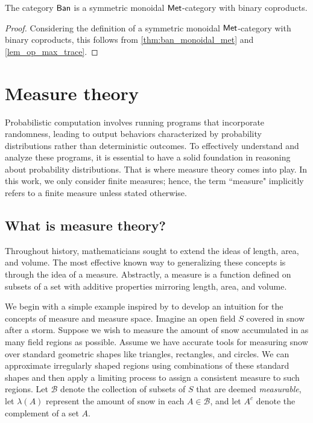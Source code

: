   \begin{theorem}
      The category $\mathsf{Ban}$ is a  symmetric monoidal $\mathsf{Met}$-category with binary coproducts.
  \end{theorem}

\begin{proof}
  Considering the definition of a symmetric monoidal $\mathsf{Met}$-category with binary coproducts, this follows from \autoref{thm:ban_monoidal_met} and \autoref{lem_op_max_trace}.    
\end{proof}



\section{Measure theory}
Probabilistic computation involves running programs that incorporate randomness, leading to output behaviors characterized by probability distributions rather than deterministic outcomes. To effectively understand and analyze these programs, it is essential to have a solid foundation in reasoning about probability distributions. That is where measure theory comes into play.
In this work, we only consider finite measures; hence, the term ``measure" implicitly refers to a finite measure unless stated otherwise.

\subsection{What is measure theory?}

Throughout history, mathematicians sought to extend the ideas of length, area, and volume. The most effective known way to generalizing these concepts is through the idea of a measure. Abstractly, a measure is a function defined on subsets of a set with additive properties mirroring length, area, and volume.

We begin with a simple example inspired by \cite{athreyaMeasureTheoryProbability2006} to develop an intuition for the concepts of measure and measure space.
Imagine an open field $S$ covered in snow after a storm. Suppose we wish to measure the amount of snow accumulated in as many field regions as possible.
Assume we have accurate tools for measuring snow over standard geometric shapes like triangles, rectangles, and circles. 
We can approximate irregularly shaped regions using combinations of these standard shapes and then apply a limiting process to assign a consistent measure to such regions. 
Let $\mathcal{B}$ denote the collection of subsets of $S$ that are deemed \emph{measurable}, let $\lambda(A)$ represent the amount of snow in each $A \in \mathcal{B}$, and let $A^c$ denote the complement of a set $A$.


